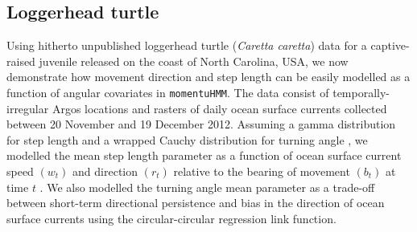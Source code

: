 \documentclass[12pt]{article}\usepackage[]{graphicx}\usepackage[]{color}
\begin{document}
\subsection{Loggerhead turtle}
\label{sec:turtle}
Using hitherto unpublished loggerhead turtle ({\it Caretta caretta}) data for a captive-raised juvenile released on the coast of North Carolina, USA, we now demonstrate how movement direction and step length can be easily modelled as a function of angular covariates in \verb|momentuHMM|. The data consist of %
temporally-irregular Argos locations and rasters of daily ocean surface currents collected between 20 November and 19 December 2012. Assuming a gamma distribution for step length %
and a wrapped Cauchy distribution for turning angle%
, we modelled the mean step length parameter %
as a function of ocean surface current speed $(w_t)$ and direction $(r_t)$ relative to the bearing of movement $(b_t)$ at time $t$%
. We also modelled the turning angle mean parameter %
as a trade-off between short-term directional persistence and bias in the direction of ocean surface currents using the circular-circular regression link function.
\end{document}

